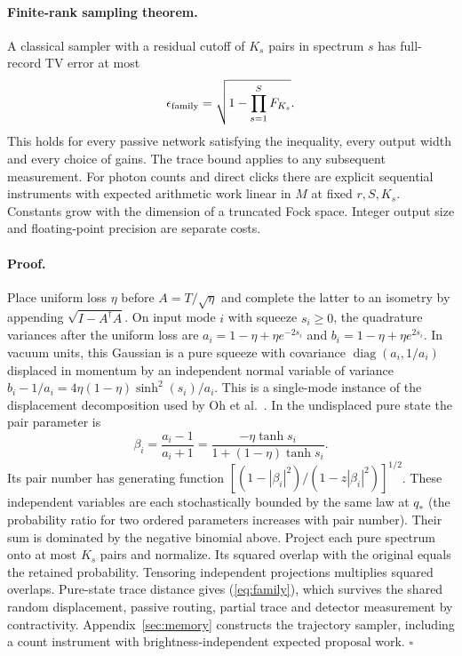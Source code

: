 \documentclass[11pt]{article}
\begin{document}
\paragraph{Finite-rank sampling theorem.}
A classical sampler with a residual cutoff of $K_s$ pairs in spectrum $s$ has full-record TV error at most
\begin{equation}
 \epsilon_{\rm family}=\sqrt{1-\prod_{s=1}^S F_{K_s}}.
 \label{eq:family}
\end{equation}
This holds for every passive network satisfying the inequality, every output width and every choice of gains. The trace bound applies to any subsequent measurement. For photon counts and direct clicks there are explicit sequential instruments with expected arithmetic work linear in $M$ at fixed $r,S,K_s$. Constants grow with the dimension of a truncated Fock space. Integer output size and floating-point precision are separate costs.

\paragraph{Proof.}
Place uniform loss $\eta$ before $A=T/\sqrt\eta$ and complete the latter to an isometry by appending $\sqrt{I-A^\dagger A}$. On input mode $i$ with squeeze $s_i\ge0$, the quadrature variances after the uniform loss are $a_i=1-\eta+\eta e^{-2s_i}$ and $b_i=1-\eta+\eta e^{2s_i}$. In vacuum units, this Gaussian is a pure squeeze with covariance $\operatorname{diag}(a_i,1/a_i)$ displaced in momentum by an independent normal variable of variance $b_i-1/a_i=4\eta(1-\eta)\sinh^2(s_i)/a_i$. This is a single-mode instance of the displacement decomposition used by Oh et al.~\cite{oh}. In the undisplaced pure state the pair parameter is
\[
 \beta_i=\frac{a_i-1}{a_i+1}
 =\frac{-\eta\tanh s_i}{1+(1-\eta)\tanh s_i}.
\]
Its pair number has generating function $[(1-|\beta_i|^2)/(1-z|\beta_i|^2)]^{1/2}$. These independent variables are each stochastically bounded by the same law at $q_*$ (the probability ratio for two ordered parameters increases with pair number). Their sum is dominated by the negative binomial above. Project each pure spectrum onto at most $K_s$ pairs and normalize. Its squared overlap with the original equals the retained probability. Tensoring independent projections multiplies squared overlaps. Pure-state trace distance gives (\ref{eq:family}), which survives the shared random displacement, passive routing, partial trace and detector measurement by contractivity. Appendix~\ref{sec:memory} constructs the trajectory sampler, including a count instrument with brightness-independent expected proposal work. \hfill$\square$
\end{document}
